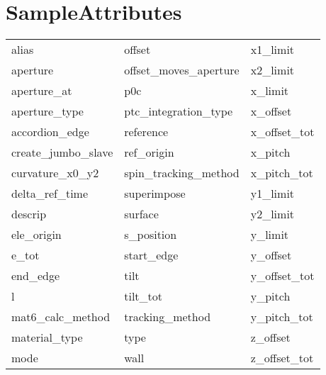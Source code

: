  \section{SampleAttributes}
 \label{s:list.sample}
 
 \begin{tabular}{lll} \toprule
alias                       & offset                      & x1_limit                    \\
aperture                    & offset_moves_aperture       & x2_limit                    \\
aperture_at                 & p0c                         & x_limit                     \\
aperture_type               & ptc_integration_type        & x_offset                    \\
accordion_edge              & reference                   & x_offset_tot                \\
create_jumbo_slave          & ref_origin                  & x_pitch                     \\
curvature_x0_y2             & spin_tracking_method        & x_pitch_tot                 \\
delta_ref_time              & superimpose                 & y1_limit                    \\
descrip                     & surface                     & y2_limit                    \\
ele_origin                  & s_position                  & y_limit                     \\
e_tot                       & start_edge                  & y_offset                    \\
end_edge                    & tilt                        & y_offset_tot                \\
l                           & tilt_tot                    & y_pitch                     \\
mat6_calc_method            & tracking_method             & y_pitch_tot                 \\
material_type               & type                        & z_offset                    \\
mode                        & wall                        & z_offset_tot                \\
 \bottomrule
 \end{tabular}
 \vfill
 
